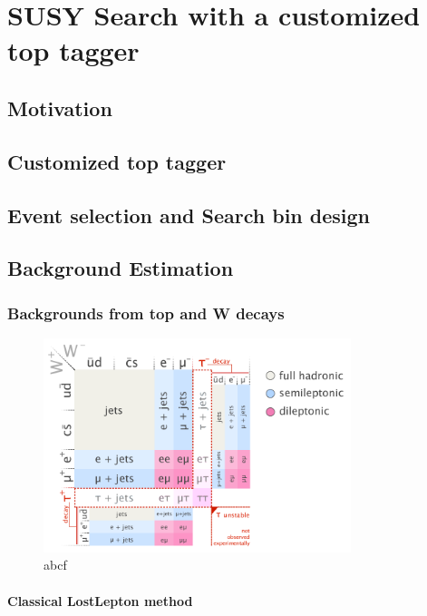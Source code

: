 \chapter{SUSY Search with a customized top tagger}
\section{Motivation}
\section{Customized top tagger}

\section{Event selection and Search bin design}

\section{Background Estimation}

\subsection{Backgrounds from top and W decays}
\begin{figure}[htbp]
 \begin{center}
  \includegraphics[width=0.8\textwidth]{figures/c4/c4_top_w_decaymod.png}
 \end{center}
 \caption{abcf}
 \label{fig:c4twdecaymod}
\end{figure}

\subsubsection{Classical LostLepton method}
